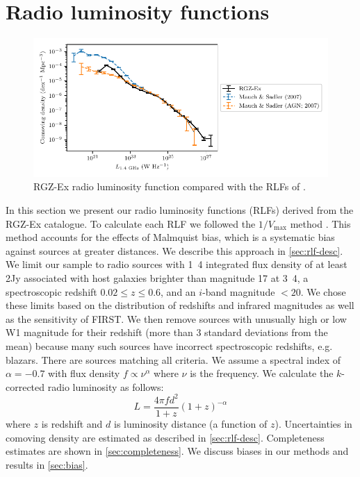 \section{Radio luminosity functions}
\label{sec:rlf}

  \begin{figure}
      \centering
    \includegraphics{rlf-images/rlf.pdf}
    \caption{RGZ-Ex radio luminosity function compared with the RLFs of \citet{mauch07rlf}.
      \label{fig:rlf}}
  \end{figure}

  In this section we present our radio luminosity functions (RLFs) derived
  from the RGZ-Ex catalogue. To calculate each RLF we 
  followed the $1/V_{\max}$ method \citep{schmidt1968vmax}. This method accounts for the effects of Malmquist bias, which is a systematic bias against sources at greater distances. We
  describe this approach in \autoref{sec:rlf-desc}. We limit our sample to radio sources with
  \unit{1.4}{\giga\hertz} integrated flux density of at least \unit{2}{\milli Jy}
  associated with host galaxies brighter than magnitude 17 at
  \unit{3.4}{\micro\meter}, a spectroscopic redshift $0.02 \leq z \leq 0.6$,
  and an $i$-band magnitude $<20$. We chose these
  limits based on the distribution of redshifts and infrared magnitudes as well as the sensitivity of FIRST. We then remove sources with unusually high or low W1 magnitude for their redshift (more than 3 standard deviations from the mean) because many such sources have incorrect spectroscopic redshifts, e.g. blazars. There are \nsourcesrlf{} sources matching all criteria. We assume a spectral index of $\alpha = -0.7$ \citep[as is common in literature, e.g.][]{condon02radio} with flux density $f \propto \nu^{\alpha}$ where $\nu$ is the frequency. We calculate the $k$-corrected radio luminosity \citep{kochanek01kband} as follows:
  \begin{equation}
      \label{eq:luminosity}
      L = \frac{4\pi f d^2}{1+z}{(1+z)^{-\alpha}}
  \end{equation}
  where $z$ is redshift and $d$ is luminosity distance (a function of $z$).
  Uncertainties in comoving density are estimated as described in \autoref{sec:rlf-desc}. Completeness estimates are shown in \autoref{sec:completeness}. We discuss biases in our methods and results in \autoref{sec:bias}.

